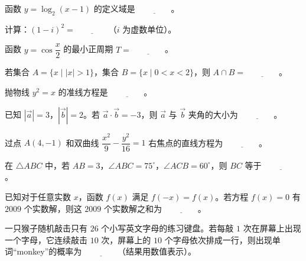 \begin{question}
函数 $y=\log_2(x-1)$ 的定义域是 $\underline{\qquad\qquad}$。

\end{question}
\begin{question}
计算：$(1-i)^2=\underline{\qquad\qquad}$（$i$ 为虚数单位）。

\end{question}
\begin{question}
函数 $y=\cos\dfrac{x}{2}$ 的最小正周期 $T=\underline{\qquad\qquad}$。

\end{question}
\begin{question}
若集合 $A=\{x\mid |x|>1\}$，集合 $B=\{x\mid 0<x<2\}$，则 $A\cap B=\underline{\qquad\qquad}$。

\end{question}
\begin{question}
抛物线 $y^2=x$ 的准线方程是 $\underline{\qquad\qquad}$。

\end{question}
\begin{question}
已知 $|\vec a|=3$，$|\vec b|=2$。若 $\vec a\cdot\vec b=-3$，则 $\vec a$ 与 $\vec b$ 夹角的大小为 $\underline{\qquad\qquad}$。

\end{question}
\begin{question}
过点 $A(4,-1)$ 和双曲线 $\dfrac{x^2}{9}-\dfrac{y^2}{16}=1$ 右焦点的直线方程为 $\underline{\qquad\qquad}$。

\end{question}
\begin{question}
在 $\triangle ABC$ 中，若 $AB=3$，$\angle ABC=75^\circ$，$\angle ACB=60^\circ$，则 $BC$ 等于 $\underline{\qquad\qquad}$。

\end{question}
\begin{question}
已知对于任意实数 $x$，函数 $f(x)$ 满足 $f(-x)=f(x)$。若方程 $f(x)=0$ 有 $2009$ 个实数解，则这 $2009$ 个实数解之和为 $\underline{\qquad\qquad}$。

\end{question}
\begin{question}
一只猴子随机敲击只有 $26$ 个小写英文字母的练习键盘。若每敲 $1$ 次在屏幕上出现一个字母，它连续敲击 $10$ 次，屏幕上的 $10$ 个字母依次排成一行，则出现单词“monkey”的概率为 $\underline{\qquad\qquad}$（结果用数值表示）。

\Needspace{0.4\textheight}
\end{question}
